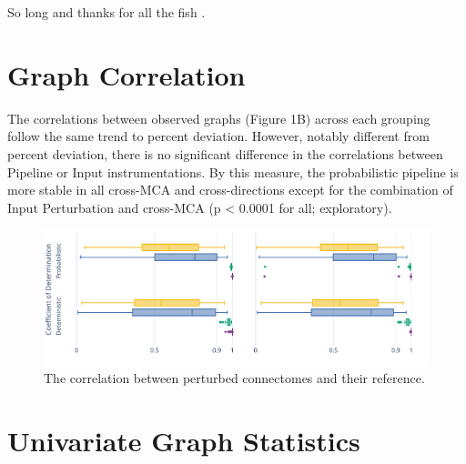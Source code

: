 \documentclass[fleqn,10pt]{SelfArx} %
\begin{document}

So long and thanks for all the fish \cite{Denis2016-wo}.




\beginsupplement

\clearpage
\section{Graph Correlation}
\label{supsec:correlation}
The correlations between observed graphs (Figure 1B) across each grouping follow the same trend to percent deviation.
However, notably different from percent deviation, there is no significant difference in the correlations between
Pipeline or Input instrumentations. By this measure, the probabilistic pipeline is more stable in all cross-MCA and
cross-directions except for the combination of Input Perturbation and cross-MCA (p < 0.0001 for all; exploratory).

\begin{figure}[ht]\centering
\includegraphics[width=\linewidth]{figures/figS1_correlation_differences.pdf}
\caption{The correlation between perturbed connectomes and their reference.}
\label{fig:correlation}
\end{figure}

\clearpage
\section{Univariate Graph Statistics}
\label{supsec:univar}
\end{document}
